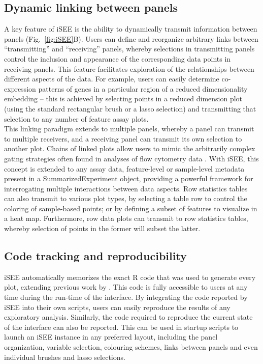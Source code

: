 \documentclass[10pt,a4paper,twocolumn]{article}
\begin{document}
\subsection*{Dynamic linking between panels}
A key feature of iSEE is the ability to dynamically transmit information between panels (Fig.~\ref{fig:iSEE}B).
Users can define and reorganize arbitrary links between ``transmitting'' and ``receiving'' panels, whereby selections in transmitting panels control the inclusion and appearance of the corresponding data points in receiving panels.
This feature facilitates exploration of the relationships between different aspects of the data.
For example, users can easily determine co-expression patterns of genes in a particular region of a reduced dimensionality embedding -- this is achieved by selecting points in a reduced dimension plot (using the standard rectangular brush or a lasso selection) and transmitting that selection to any number of feature assay plots.\\

This linking paradigm extends to multiple panels, whereby a panel can transmit to multiple receivers, and a receiving panel can transmit its own selection to another plot.
Chains of linked plots allow users to mimic the arbitrarily complex gating strategies often found in analyses of flow cytometry data \citep{finak2014opencyto}.
With iSEE, this concept is extended to any assay data, feature-level or sample-level metadata present in a SummarizedExperiment object, providing a powerful framework for interrogating multiple interactions between data aspects.
Row statistics tables can also transmit to various plot types, by selecting a table row to control the coloring of sample-based points;
or by defining a subset of features to visualize in a heat map.
Furthermore, row data plots can transmit to row statistics tables, whereby selection of points in the former will subset the latter.

\subsection*{Code tracking and reproducibility}

iSEE automatically memorizes the exact R code that was used to generate every plot, extending previous work by \citet{marini2016interrepro}.
This code is fully accessible to users at any time during the run-time of the interface.
By integrating the code reported by iSEE into their own scripts, users can easily reproduce the results of any exploratory analysis.
Similarly, the code required to reproduce the current state of the interface can also be reported.
This can be used in startup scripts to launch an iSEE instance in any preferred layout, including the panel organization, variable selection, colouring schemes, links between panels and even individual brushes and lasso selections.
\end{document}
